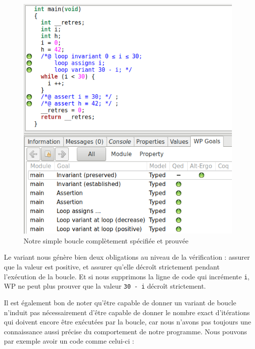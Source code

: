 \documentclass[12pt,francais,]{scrbook}
\begin{document}
\begin{figure}[htbp]
\centering
\includegraphics[scale=0.5]{3-3-boucle_complete.png}
\caption{Notre simple boucle complètement spécifiée et prouvée}
\label{fig:3-3-loop-ok}
\end{figure}

Le variant nous génère bien deux obligations au niveau de la
vérification : assurer que la valeur est positive, et assurer qu'elle
décroît strictement pendant l'exécution de la boucle. Et si nous
supprimons la ligne de code qui incrémente \texttt{i}, WP ne peut plus
prouver que la valeur \texttt{30\ -\ i} décroît strictement.

Il est également bon de noter qu'être capable de donner un variant de
boucle n'induit pas nécessairement d'être capable de donner le nombre
exact d'itérations qui doivent encore être exécutées par la boucle, car
nous n'avons pas toujours une connaissance aussi précise du comportement
de notre programme. Nous pouvons par exemple avoir un code comme
celui-ci :
\end{document}

